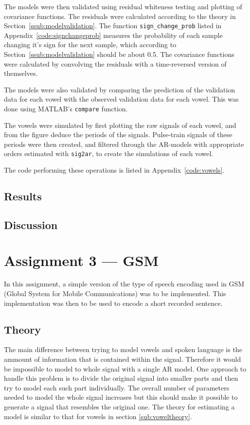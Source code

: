 \documentclass{IEEEtran}
\newcommand{\code}[1]{\texttt{#1}}
\begin{document}
The models were then validated using residual whiteness testing and plotting of
covariance functions. The residuals were calculated according to the theory in
Section~\ref{ssub:modelvalidation}. The function \code{sign\_change\_prob}
listed in Appendix~\ref{code:signchangeprob}
measures the probability of each sample changing it's sign for the next
sample, which according to Section~\ref{ssub:modelvalidation} should be about
0.5. The covariance functions were calculated by convolving the residuals with
a time-reversed version of themselves.

The models were also validated by comparing the prediction of the validation
data for each vowel with the observed validation data for each vowel. This was
done using MATLAB's \code{compare} function.

The vowels were simulated by first plotting the raw signals of each vowel, and
from the figure deduce the periods of the signals. Pulse-train signals of these
periods were then created, and filtered through the AR-models with appropriate
orders estimated with \code{sig2ar}, to create the simulations of each vowel.

The code performing these operations is listed in Appendix~\ref{code:vowels}.

\subsection{Results}


\subsection{Discussion}

\section{Assignment 3 --- GSM}

In this assignment, a simple version of the type of speech encoding used in GSM
(Global System for Mobile Communications) was to be implemented. This
implementation was then to be used to encode a short recorded sentence.

\subsection{Theory}
\label{sub:vimtheory}

The main difference between trying to model vowels and spoken language
is the ammount of information that is contained within the signal.
Therefore it would be impossible to model to whole signal with a
single AR model. One approach to handle this problem is to divide
the original signal into smaller parts and then try to model each such
part individually. The overall number of parameters needed to model the
whole signal increases but this should make it possible to generate a
signal that resembles the original one. The theory for estimating a
model is similar to that for vowels in section \ref{sub:voweltheory}.
\end{document}
